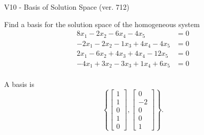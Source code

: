 \begin{exercise}
  \begin{exerciseTitle}V10 - Basis of Solution Space (ver. 712)\end{exerciseTitle}
  \begin{exerciseStatement}
    Find a basis for the solution space of the homogeneous system 
\begin{align*}
 8 x_ 1 -2 x_ 2 -6 x_ 4 -4 x_ 5 &= 0  \\ 
  -2 x_ 1 -2 x_ 2 -1 x_ 3 + 4 x_ 4 -4 x_ 5 &= 0  \\ 
  2 x_ 1 -6 x_ 2 + 4 x_ 3 + 4 x_ 4 -12 x_ 5 &= 0  \\ 
  -4 x_ 1 + 3 x_ 2 -3 x_ 3 + 1 x_ 4 + 6 x_ 5 &= 0  \\ 
 \end{align*}


 
  \end{exerciseStatement}

  \begin{exerciseAnswer}
   A basis is   
\[\left\{\left[\begin{array}{c}
1 \\
1 \\
0 \\
1 \\
0
\end{array}\right] , \left[\begin{array}{c}
0 \\
-2 \\
0 \\
0 \\
1
\end{array}\right]\right\}.\]

  


  \end{exerciseAnswer}
\end{exercise}